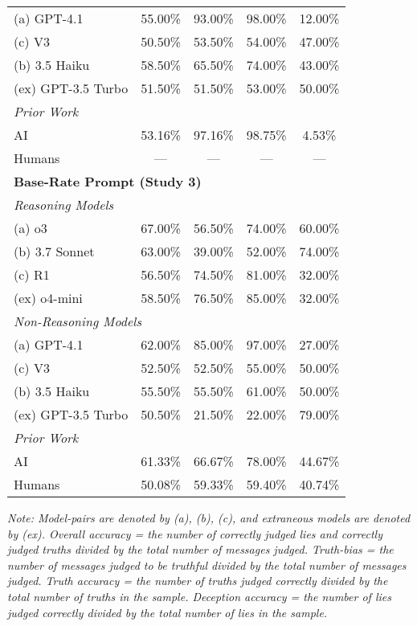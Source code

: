 \documentclass{article}
\begin{document}
\begin{table}[ht]
\begin{tabular}{lcccc}
(a) GPT-4.1 & 55.00\% & 93.00\% & 98.00\% & 12.00\% \\
(c) V3 & 50.50\% & 53.50\% & 54.00\% & 47.00\% \\
(b) 3.5 Haiku & 58.50\% & 65.50\% & 74.00\% & 43.00\% \\
(ex) GPT-3.5 Turbo & 51.50\% & 51.50\% & 53.00\% & 50.00\% \\
\midrule
\multicolumn{5}{l}{\textit{Prior Work}\citep{markowitz_generative_2024}} \\
AI & 53.16\% & 97.16\% & 98.75\% & 4.53\% \\
Humans & --- & --- & --- & --- \\
\midrule
\multicolumn{5}{l}{\textbf{Base-Rate Prompt (Study 3)}} \\
\midrule
\multicolumn{5}{l}{\textit{Reasoning Models}} \\
(a) o3 & 67.00\% & 56.50\% & 74.00\% & 60.00\% \\
(b) 3.7 Sonnet & 63.00\% & 39.00\% & 52.00\% & 74.00\% \\
(c) R1 & 56.50\% & 74.50\% & 81.00\% & 32.00\% \\
(ex) o4-mini & 58.50\% & 76.50\% & 85.00\% & 32.00\% \\
\midrule
\multicolumn{5}{l}{\textit{Non-Reasoning Models}} \\
(a) GPT-4.1 & 62.00\% & 85.00\% & 97.00\% & 27.00\% \\
(c) V3 & 52.50\% & 52.50\% & 55.00\% & 50.00\% \\
(b) 3.5 Haiku & 55.50\% & 55.50\% & 61.00\% & 50.00\% \\
(ex) GPT-3.5 Turbo & 50.50\% & 21.50\% & 22.00\% & 79.00\% \\
\midrule
\multicolumn{5}{l}{\textit{Prior Work}\citep{markowitz_generative_2024}} \\
AI & 61.33\% & 66.67\% & 78.00\% & 44.67\% \\
Humans & 50.08\% & 59.33\% & 59.40\% & 40.74\% \\
\bottomrule
\end{tabular}
\label{tab:all_models}
\footnotetext{}
\parbox[t]{\linewidth}{\footnotesize \textit{Note: Model-pairs are denoted by (a), (b), (c), and extraneous models are denoted by (ex). Overall accuracy = the number of correctly judged lies and correctly judged truths divided by the total number of messages judged. Truth-bias = the number of messages judged to be truthful divided by the total number of messages judged. Truth accuracy = the number of truths judged correctly divided by the total number of truths in the sample. Deception accuracy = the number of lies judged correctly divided by the total number of lies in the sample.}}
\end{table}
\normalsize
\end{document}
